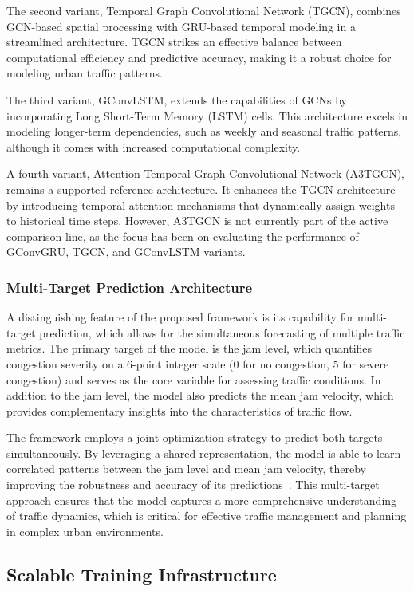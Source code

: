 \documentclass[11pt, a4paper]{article}
\begin{document}
The second variant, Temporal Graph Convolutional Network (TGCN), combines GCN-based spatial processing with GRU-based temporal modeling in a streamlined architecture. TGCN strikes an effective balance between computational efficiency and predictive accuracy, making it a robust choice for modeling urban traffic patterns.

The third variant, GConvLSTM, extends the capabilities of GCNs by incorporating Long Short-Term Memory (LSTM) cells. This architecture excels in modeling longer-term dependencies, such as weekly and seasonal traffic patterns, although it comes with increased computational complexity.

A fourth variant, Attention Temporal Graph Convolutional Network (A3TGCN), remains a supported reference architecture. It enhances the TGCN architecture by introducing temporal attention mechanisms that dynamically assign weights to historical time steps. However, A3TGCN is not currently part of the active comparison line, as the focus has been on evaluating the performance of GConvGRU, TGCN, and GConvLSTM variants.

\subsubsection{Multi-Target Prediction Architecture}
A distinguishing feature of the proposed framework is its capability for multi-target prediction, which allows for the simultaneous forecasting of multiple traffic metrics. The primary target of the model is the jam level, which quantifies congestion severity on a 6-point integer scale (0 for no congestion, 5 for severe congestion) and serves as the core variable for assessing traffic conditions. In addition to the jam level, the model also predicts the mean jam velocity, which provides complementary insights into the characteristics of traffic flow.

The framework employs a joint optimization strategy to predict both targets simultaneously. By leveraging a shared representation, the model is able to learn correlated patterns between the jam level and mean jam velocity, thereby improving the robustness and accuracy of its predictions~\cite{caruana1997multitask}. This multi-target approach ensures that the model captures a more comprehensive understanding of traffic dynamics, which is critical for effective traffic management and planning in complex urban environments.

\subsection{Scalable Training Infrastructure}
\end{document}
